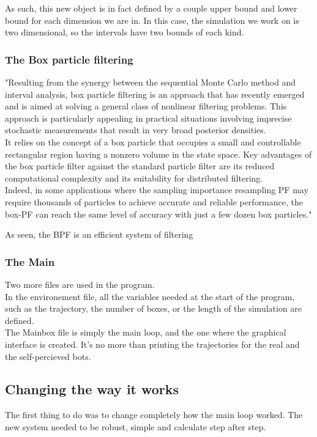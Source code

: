 As such, this new object is in fact defined by a couple upper bound and lower bound for each dimension we are in.
In this case, the simulation we work on is two dimensional, so the intervals have two bounds of each kind.
\subsubsection{The Box particle filtering}
"Resulting from the synergy between the sequential Monte Carlo method and interval analysis, box particle filtering is an approach that has recently emerged and is aimed at solving a general class of nonlinear filtering problems.
This approach is particularly appealing in practical situations involving imprecise stochastic measurements that result in very broad posterior densities.\\

It relies on the concept of a box particle that occupies a small and controllable rectangular region having a nonzero volume in the state space.
Key advantages of the box particle filter against the standard particle filter are its reduced computational complexity and its suitability for distributed filtering.\\

Indeed, in some applications where the sampling importance resampling PF may require thousands of particles to achieve accurate and reliable performance, the box-PF can reach the same level of accuracy with just a few dozen box particles."\parencite{BPF}

As seen, the BPF is an efficient system of filtering
\subsubsection{The Main}
Two more files are used in the program.\\

In the environement file, all the variables needed at the start of the program,
 such as the trajectory, the number of boxes, or the length of the simulation are defined.\\

The Mainbox file is simply the main loop, and the one where the graphical interface is created. It's no more than printing the trajectories for the real and the self-percieved bots.

\subsection{Changing the way it works}
The first thing to do was to change completely how the main loop worked.
The new system needed to be robust, simple and calculate step after step.\\

